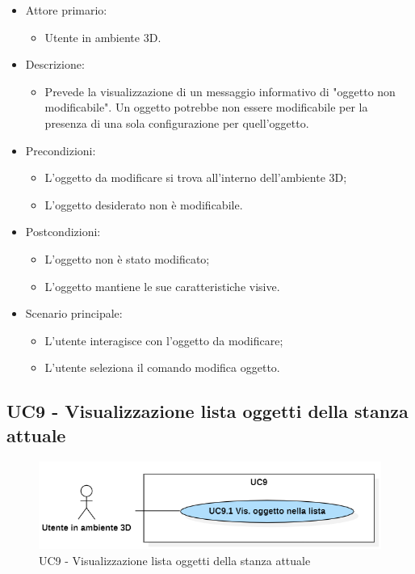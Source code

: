 \begin{itemize}

	\item Attore primario: 
	\begin{itemize}
		\item Utente in ambiente 3D.
	\end{itemize}
	\item Descrizione:
	\begin{itemize}
		\item Prevede la visualizzazione di un messaggio informativo di "oggetto non modificabile".
\newline Un oggetto potrebbe non essere modificabile per la presenza di una sola configurazione per quell'oggetto.
	\end{itemize}
	
	\item Precondizioni:
	\begin{itemize}
		\item L'oggetto da modificare si trova all'interno dell'ambiente 3D;
		\item L'oggetto desiderato non è modificabile.
	\end{itemize}
	
	\item Postcondizioni:
	\begin{itemize}
		\item L'oggetto non è stato modificato;
		\item L'oggetto mantiene le sue caratteristiche visive.
	\end{itemize}
	
	\item Scenario principale:
	\begin{itemize}
		\item L'utente interagisce con l'oggetto da modificare;
		\item L'utente seleziona il comando modifica oggetto.
	\end{itemize}
	
\end{itemize}

\pagebreak

\subsection{UC9 - Visualizzazione lista oggetti della stanza attuale}

\begin{figure}[H]
  \renewcommand{\thefigure}{9}
  \includegraphics[width=\linewidth]{./res/images/UC9.png}
  \caption{UC9 - Visualizzazione lista oggetti della stanza attuale}
  \label{fig:UC 9}
\end{figure}

